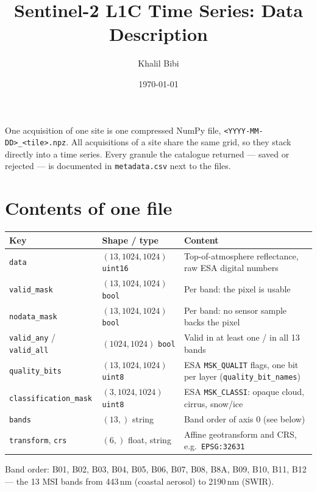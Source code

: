 \documentclass[10pt,a4paper]{article}
\title{\vspace{-1.6cm}Sentinel-2 L1C Time Series: Data Description}
\author{Khalil Bibi}
\date{\today}
\begin{document}
\maketitle
\vspace{-0.8em}

One acquisition of one site is one compressed NumPy file, \texttt{<YYYY-MM-DD>\_<tile>.npz}.
All acquisitions of a site share the same grid, so they stack directly into a time series.
Every granule the catalogue returned --- saved or rejected --- is documented in
\texttt{metadata.csv} next to the files.

\section{Contents of one file}

\begin{center}
\small
\begin{tabular}{llp{8.6cm}}
\toprule
Key & Shape / type & Content \\
\midrule
\texttt{data}     & $(13,1024,1024)$ \texttt{uint16} & Top-of-atmosphere reflectance, raw ESA digital numbers \\
\texttt{valid\_mask}   & $(13,1024,1024)$ \texttt{bool} & Per band: the pixel is usable \\
\texttt{nodata\_mask}  & $(13,1024,1024)$ \texttt{bool} & Per band: no sensor sample backs the pixel \\
\texttt{valid\_any} / \texttt{valid\_all} & $(1024,1024)$ \texttt{bool} & Valid in at least one / in all 13 bands \\
\texttt{quality\_bits} & $(13,1024,1024)$ \texttt{uint8} & ESA \texttt{MSK\_QUALIT} flags, one bit per layer (\texttt{quality\_bit\_names}) \\
\texttt{classification\_mask} & $(3,1024,1024)$ \texttt{uint8} & ESA \texttt{MSK\_CLASSI}: opaque cloud, cirrus, snow/ice \\
\texttt{bands} & $(13,)$ string & Band order of axis 0 (see below) \\
\texttt{transform}, \texttt{crs} & $(6,)$ float, string & Affine geotransform and CRS, e.g.\ \texttt{EPSG:32631} \\
\bottomrule
\end{tabular}
\end{center}

Band order: B01, B02, B03, B04, B05, B06, B07, B08, B8A, B09, B10, B11, B12 --- the 13 MSI
bands from 443\,nm (coastal aerosol) to 2190\,nm (SWIR).
\end{document}
